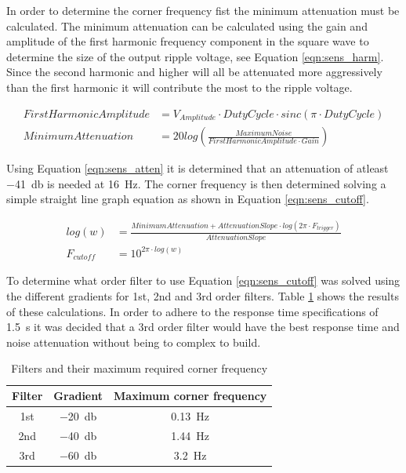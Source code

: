 In order to determine the corner frequency fist the minimum attenuation must be calculated. The minimum attenuation can be calculated using the gain and amplitude of the first harmonic frequency component in the square wave to determine the size of the output ripple voltage, see Equation \ref{eqn:sens_harm}. Since the second harmonic and higher will all be attenuated more aggressively than the first harmonic it will contribute the most to the ripple voltage. 

\begin{align}
First Harmonic Amplitude &= V_{Amplitude} \cdot DutyCycle \cdot sinc(\pi \cdot DutyCycle)\label{eqn:sens_harm}\\
MinimumAttenuation &= 20log(\frac{MaximumNoise}{FirstHarmonicAmplitude \cdot Gain})\label{eqn:sens_atten}
\end{align}

Using Equation \ref{eqn:sens_atten} it is determined that an attenuation of atleast \SI{-41}{\decibel} is needed at \SI{16}{\hertz}. The corner frequency is then determined solving a simple straight line graph equation as shown in Equation \ref{eqn:sens_cutoff}.

\begin{align}
log(w) &= \frac{MinimumAttenuation+AttenuationSlope \cdot log(2\pi \cdot F_{trigger})}{AttenuationSlope}\\
F_{cutoff} &= 10^{2\pi \cdot log(w)}\label{eqn:sens_cutoff}
\end{align}

To determine what order filter to use Equation \ref{eqn:sens_cutoff} was solved using the different gradients for 1st, 2nd and 3rd order filters. Table \ref{tbl:sens_cutoff} shows the results of these calculations. In order to adhere to the response time specifications of \SI{1.5}{\second} it was decided that a 3rd order filter would have the best response time and noise attenuation without being to complex to build. 

\begin{table}
\begin{center}
\begin{tabular}{|c|c|c|}
\hline
Filter & Gradient & Maximum corner frequency\\
\hline
1st & \SI{-20}{\decibel} & \SI{0.13}{\hertz}\\
2nd & \SI{-40}{\decibel} & \SI{1.44}{\hertz}\\
3rd & \SI{-60}{\decibel} & \SI{3.2}{\hertz}\\
\hline
\end{tabular}
\end{center}
\caption{Filters and their maximum required corner frequency}
\label{tbl:sens_cutoff}
\end{table}

